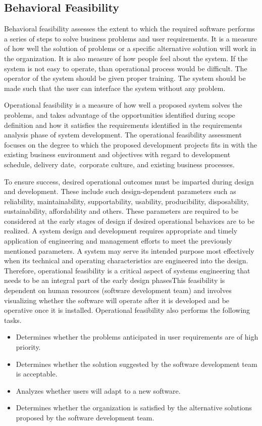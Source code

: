 \subsection{Behavioral Feasibility}
Behavioral feasibility assesses the extent to which the required software performs a series of steps to solve business problems and user requirements. It is a measure of how well the solution of problems or a specific alternative solution will work in the organization. It is also measure of how people feel about the system. If the system is not easy to operate, than operational process would be difficult. The operator of the system should be given proper training. The system should be made such that the user can interface the system without any problem.

Operational feasibility is a measure of how well a proposed system solves the problems, and takes advantage of the opportunities identified during scope definition and how it satisfies the requirements identified in the requirements analysis phase of system development. The operational feasibility assessment focuses on the degree to which the proposed development projects fits in with the existing business environment and objectives with regard to development schedule, delivery date, corporate culture, and existing business processes.

To ensure success, desired operational outcomes must be imparted during design and development. These include such design-dependent parameters such as reliability, maintainability, supportability, usability, producibility, disposability, sustainability, affordability and others. These parameters are required to be considered at the early stages of design if desired operational behaviors are to be realized. A system design and development requires appropriate and timely application of engineering and management efforts to meet the previously mentioned parameters. A system may serve its intended purpose most effectively when its technical and operating characteristics are engineered into the design. Therefore, operational feasibility is a critical aspect of systems engineering that needs to be an integral part of the early design phasesThis feasibility is dependent on human resources (software development team) and involves visualizing whether the software will operate after it is developed and be operative once it is installed. Operational feasibility also performs the following tasks.

\begin{itemize}
	\item Determines whether the problems anticipated in user requirements are of high priority.
	\item Determines whether the solution suggested by the software development team is acceptable.
	\item Analyzes whether users will adapt to a new software.
	\item Determines whether the organization is satisfied by the alternative solutions proposed by the software development team.
\end{itemize}

